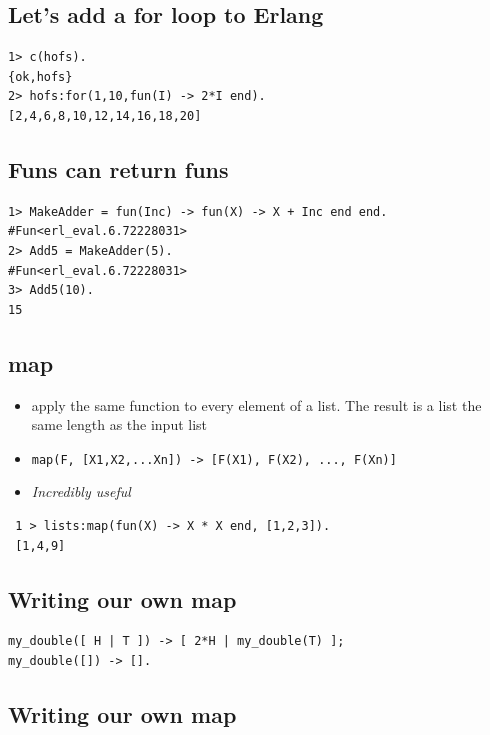 \documentclass[12pt]{article}
\begin{document}
\subsection{Let's add a for loop to Erlang}



\begin{verbatim}
1> c(hofs).
{ok,hofs}
2> hofs:for(1,10,fun(I) -> 2*I end).
[2,4,6,8,10,12,14,16,18,20]
\end{verbatim}

\subsection{Funs can return funs}

\begin{verbatim}
1> MakeAdder = fun(Inc) -> fun(X) -> X + Inc end end.
#Fun<erl_eval.6.72228031>
2> Add5 = MakeAdder(5).
#Fun<erl_eval.6.72228031>
3> Add5(10).
15
\end{verbatim}

\subsection{map}

\begin{itemize}
\item apply the same function to every element of a list.
The result is a list the same length as the input list
\item \verb+map(F, [X1,X2,...Xn]) -> [F(X1), F(X2), ..., F(Xn)]+
\item {\sl Incredibly useful}
\end{itemize}

\begin{verbatim}
 1 > lists:map(fun(X) -> X * X end, [1,2,3]).
 [1,4,9]
\end{verbatim}

\subsection{Writing our own map}


\begin{verbatim}
my_double([ H | T ]) -> [ 2*H | my_double(T) ];
my_double([]) -> [].
\end{verbatim}

\subsection{Writing our own map}
\end{document}
